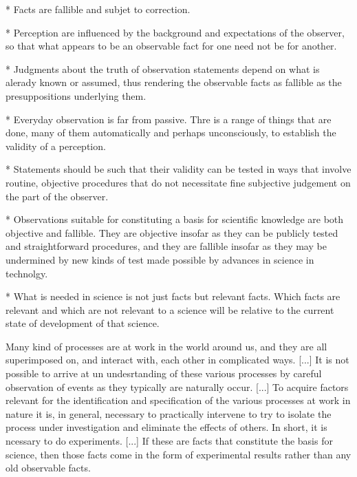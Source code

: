 * Facts are fallible and subjet to correction.

* Perception are influenced by the background and expectations of the observer, so that what appears to be an observable fact for one need not be for another.

* Judgments about the truth of observation statements depend on what is alerady known or assumed, thus rendering the observable facts as fallible as the presuppositions underlying them.

* Everyday observation is far from passive. Thre is a range of things that  are done, many of them automatically and perhaps unconsciously, to establish the validity of a perception.

* Statements should be such that their validity can be tested in ways that involve routine, objective procedures that do not necessitate fine subjective judgement on the part of the observer.

* Observations suitable for constituting a basis for scientific knowledge are both objective and fallible. They are objective insofar as they can be publicly tested and straightforward procedures, and they are fallible insofar as they may be undermined by new kinds of test made possible by advances in science in technolgy.

* What is needed in science is not just facts but relevant facts. Which facts are relevant and which are not relevant to a science will be relative to the current state of development of that science. 

{\color{red} Many kind of processes are at work in the world around us, and they are all superimposed on, and interact with, each other in complicated ways. [...] It is not possible to arrive at un undesrtanding of these various processes by careful observation of events as they typically are naturally occur. [...] To acquire factors relevant for the identification and specification of the various processes at work in nature it is, in general, necessary to practically intervene to try to isolate the process under investigation and eliminate the effects of others. In short, it is ncessary to do experiments. [...] If these are facts that constitute the basis for science, then those facts come in the form of experimental results rather than any old observable facts. }

